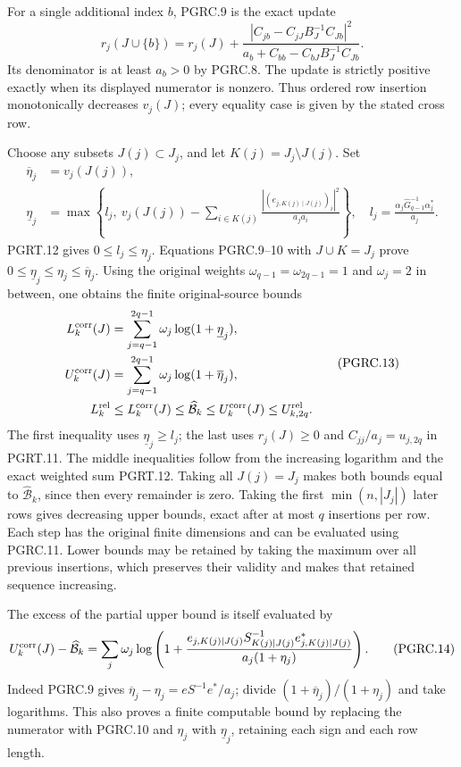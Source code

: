 For a single additional index $b$, PGRC.9 is the exact update
\[
 r_j(J\cup\{b\})=r_j(J)+
 \frac{|C_{jb}-C_{jJ}B_J^{-1}C_{Jb}|^2}
 {a_b+C_{bb}-C_{bJ}B_J^{-1}C_{Jb}}.
 \tag{PGRC.11}\label{GraphV2:eq:pgrc-single-update}
\]
Its denominator is at least $a_b>0$ by PGRC.8. The update
is strictly positive exactly when its displayed numerator is
nonzero. Thus ordered row insertion monotonically decreases
$v_j(J)$; every equality case is given by the stated cross row.

Choose any subsets $J(j)\subset J_j$, and let
$K(j)=J_j\setminus J(j)$. Set
\[
 \begin{aligned}
 \overline\eta_j&=v_j(J(j)),\\
 \underline\eta_j
 &=\max\left\{l_j,\ v_j(J(j))-
       \sum_{i\in K(j)}
       \frac{|(e_{j,K(j)\mid J(j)})_i|^2}{a_ja_i}\right\},
 \quad l_j=\frac{\alpha_j\widehat G_{q-1}^{-1}\alpha_j^*}{a_j}.
 \end{aligned}
 \tag{PGRC.12}\label{GraphV2:eq:pgrc-row-enclosure}
\]
PGRT.12 gives $0\leq l_j\leq\eta_j$. Equations PGRC.9--10
with $J\cup K=J_j$ prove
$0\leq\underline\eta_j\leq\eta_j\leq\overline\eta_j$.
Using the original weights
$\omega_{q-1}=\omega_{2q-1}=1$ and $\omega_j=2$ in between,
one obtains the finite original-source bounds
\[
 \begin{aligned}
 L_k^{\rm corr}(J)&=\sum_{j=q-1}^{2q-1}
                         \omega_j\log(1+\underline\eta_j),\\
 U_k^{\rm corr}(J)&=\sum_{j=q-1}^{2q-1}
                         \omega_j\log(1+\overline\eta_j),\\
 L_k^{\rm rel}&\leq L_k^{\rm corr}(J)
 \leq\widehat{\mathcal B}_k\leq U_k^{\rm corr}(J)
 \leq U_{k,2q}^{\rm rel}.
 \end{aligned}
 \tag{PGRC.13}\label{GraphV2:eq:pgrc-volume-enclosure}
\]
The first inequality uses $\underline\eta_j\geq l_j$;
the last uses $r_j(J)\geq0$ and
$C_{jj}/a_j=u_{j,2q}$ in PGRT.11. The middle inequalities
follow from the increasing logarithm and the exact weighted sum
PGRT.12. Taking all $J(j)=J_j$ makes both bounds equal to
$\widehat{\mathcal B}_k$, since then every remainder is zero.
Taking the first $\min(n,|J_j|)$ later rows gives decreasing
upper bounds, exact after at most $q$ insertions per row. Each
step has the original finite dimensions and can be evaluated
using PGRC.11. Lower bounds may be retained by taking the
maximum over all previous insertions, which preserves their
validity and makes that retained sequence increasing.

The excess of the partial upper bound is itself evaluated by
\[
 U_k^{\rm corr}(J)-\widehat{\mathcal B}_k
 =\sum_j\omega_j\log\left(1+
 \frac{e_{j,K(j)\mid J(j)}S_{K(j)\mid J(j)}^{-1}
                 e_{j,K(j)\mid J(j)}^*}
 {a_j(1+\eta_j)}\right).
 \tag{PGRC.14}\label{GraphV2:eq:pgrc-volume-error}
\]
Indeed PGRC.9 gives
$\overline\eta_j-\eta_j=eS^{-1}e^*/a_j$; divide
$(1+\overline\eta_j)/(1+\eta_j)$ and take logarithms.
This also proves a finite computable bound by replacing the
numerator with PGRC.10 and $\eta_j$ with
$\underline\eta_j$, retaining each sign and each row length.

